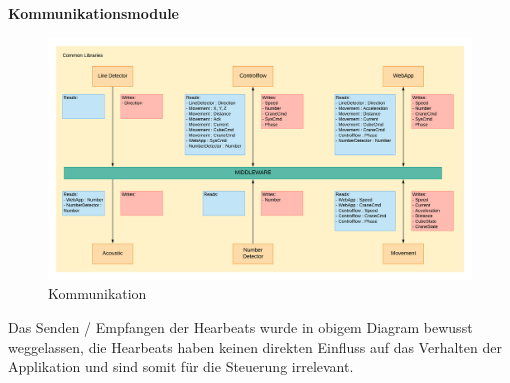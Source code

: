\documentclass[../../main.tex]{subfiles}
\begin{document}
\textbf{Kommunikationsmodule} \\
\begin{figure}[H] \centering
  \includegraphics[width=1\textwidth]{Architektur}
  \caption{Kommunikation}
  \label{fig:Kommunikation}
\end{figure}
Das Senden / Empfangen der Hearbeats wurde in obigem Diagram bewusst weggelassen, die Hearbeats haben keinen direkten Einfluss auf das Verhalten der Applikation und sind somit für die Steuerung irrelevant.
\end{document}
